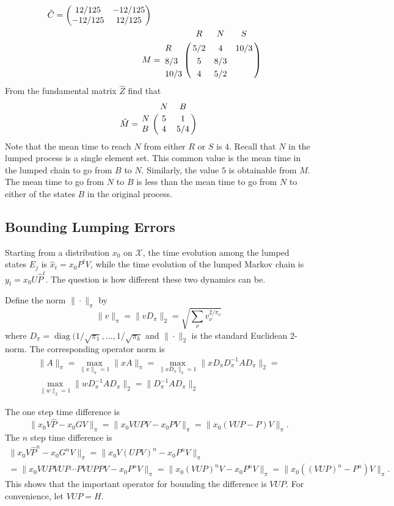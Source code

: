 \documentclass[12pt]{article}
\begin{document}
\begin{example}
\begin{example}
\begin{align*}
    \hat{C} =
    \begin{pmatrix}
      12/125  & -12/125 \\
    -12/125   &  12/125
  \end{pmatrix} \\
    M &= \bordermatrix{
        & R & N & S \cr
    R & 5/2 & 4 & 10/3 \cr
    8/3 & 5 & 8/3 \cr
    10/3 & 4 & 5/2          
               }
  \end{align*}
  From the fundamental matrix \( \hat{Z} \) find that
  \[
    \hat{M} = \bordermatrix{
      & N & B \cr
      N & 5 & 1 \cr
      B & 4 & 5/4
    }
  \]
Note that the mean time to reach \( N \) from either \( R \) or \( S
\) is \( 4 \).  Recall that \( N \) in the lumped process is a single
element set.  This common value is the mean time in the lumped chain
to go from $B$ to $N$.  Similarly, the value \( 5 \) is obtainable
from \( M \).  The mean time to go from $N$ to $B$ is less than the
mean time to go from $N$ to either of the states $B$ in the original
process.
\end{example}

\subsection*{Bounding Lumping Errors}

Starting from a distribution $x_0$ on $\mathcal{X}$, the time
evolution among the lumped states $E_j$ is $\hat{x}_{t} = x_0 P^t V$,
while the time evolution of the lumped Markov chain is $y_t = x_0U
\hat{P}^t$.  The question is how different these two dynamics can be.

Define the norm $\| \cdot \|_{\pi}$ by
\[
  \| v\|_{\pi} = \| v D_{\pi} \|_2 = \sqrt{\sum_{\nu}
    v_{\nu}^{2/\pi_\nu}}
\]
where $D_{\pi} = \operatorname{diag}(1/\sqrt{\pi_1}, \dots,
1/\sqrt{\pi_k}$ and $\| \cdot \|_2$ is the standard Euclidean
$2$-norm.  The corresponding operator norm is
\begin{multline*}
  \| A \|_{\pi} = \max_{\|x\|_{\pi}=1}\|xA\|_{\pi} =
  \max_{\|xD_{\pi}\|_2 = 1}\|x D_{\pi} D_{\pi}^{-1} A D_{\pi}\|_{2} = \\
  \max_{\|w\|_2 = 1}\|w D_{\pi}^{-1} A D_{\pi}\|_{2} =
  \| D_{\pi}^{-1} A D_{\pi}\|_{2}
\end{multline*}

The one step time difference is
\[
  \| x_0 V \hat{P} - x_0 G V \|_{\pi} = \| x_0 V U P V - x_0 P V
  \|_{\pi} = \| x_0 (VUP - P) V \|_{\pi}.
\]
The $n$ step time difference is
\begin{multline*}
  \| x_0 V \hat{P}^n - x_0 G^n V \|_{\pi} = \| x_0 V (U P V)^n - x_0 P^n V
  \|_{\pi} \\
  = \| x_0 VUPVUP \cdots PVUPPV  - x_0 P^n V \|_{\pi} = \| x_0
  (VUP)^nV - x_0 P^n V \|_{\pi} = \| x_0 ((VUP)^n - P^n) V \|_{\pi}.
\end{multline*}
This shows that the important operator for bounding the difference is $VUP$.
For convenience, let $VUP = H$.


\end{example}
\end{document}
